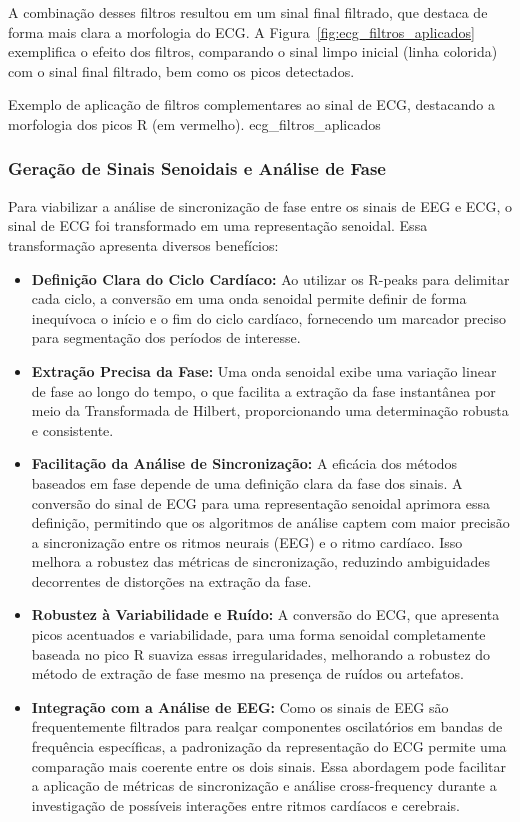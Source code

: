 A combinação desses filtros resultou em um sinal final filtrado, que destaca de forma mais clara a morfologia do ECG. A Figura~\ref{fig:ecg_filtros_aplicados} exemplifica o efeito dos filtros, comparando o sinal limpo inicial (linha colorida) com o sinal final filtrado, bem como os picos detectados.

{Exemplo de aplicação de filtros complementares ao sinal de ECG, destacando a morfologia dos picos R (em vermelho).}
{ecg_filtros_aplicados}


\subsubsection{Geração de Sinais Senoidais e Análise de Fase}

Para viabilizar a análise de sincronização de fase entre os sinais de EEG e ECG, o sinal de ECG foi transformado em uma representação senoidal. Essa transformação apresenta diversos benefícios:
\begin{itemize}
    \item \textbf{Definição Clara do Ciclo Cardíaco:} Ao utilizar os R-peaks para delimitar cada ciclo, a conversão em uma onda senoidal permite definir de forma inequívoca o início e o fim do ciclo cardíaco, fornecendo um marcador preciso para segmentação dos períodos de interesse.
    \item \textbf{Extração Precisa da Fase:} Uma onda senoidal exibe uma variação linear de fase ao longo do tempo, o que facilita a extração da fase instantânea por meio da Transformada de Hilbert, proporcionando uma determinação robusta e consistente.
    \item \textbf{Facilitação da Análise de Sincronização:} A eficácia dos métodos baseados em fase depende de uma definição clara da fase dos sinais. A conversão do sinal de ECG para uma representação senoidal aprimora essa definição, permitindo que os algoritmos de análise captem com maior precisão a sincronização entre os ritmos neurais (EEG) e o ritmo cardíaco. Isso melhora a robustez das métricas de sincronização, reduzindo ambiguidades decorrentes de distorções na extração da fase.
    \item \textbf{Robustez à Variabilidade e Ruído:} A conversão do ECG, que apresenta picos acentuados e variabilidade, para uma forma senoidal completamente baseada no pico R suaviza essas irregularidades, melhorando a robustez do método de extração de fase mesmo na presença de ruídos ou artefatos.
    \item \textbf{Integração com a Análise de EEG:} Como os sinais de EEG são frequentemente filtrados para realçar componentes oscilatórios em bandas de frequência específicas, a padronização da representação do ECG permite uma comparação mais coerente entre os dois sinais. Essa abordagem pode facilitar a aplicação de métricas de sincronização e análise cross-frequency durante a investigação de possíveis interações entre ritmos cardíacos e cerebrais.
\end{itemize}

